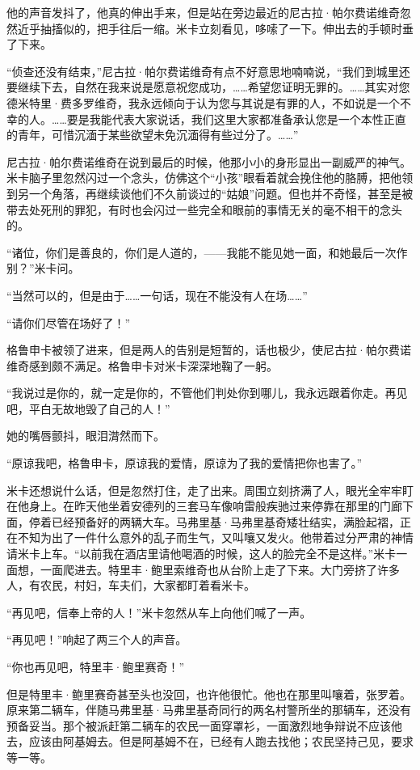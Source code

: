 \par 他的声音发抖了，他真的伸出手来，但是站在旁边最近的尼古拉·帕尔费诺维奇忽然近乎抽搐似的，把手往后一缩。米卡立刻看见，哆嗦了一下。伸出去的手顿时垂了下来。
\par “侦查还没有结束，”尼古拉·帕尔费诺维奇有点不好意思地喃喃说，“我们到城里还要继续下去，自然在我来说是愿意祝您成功，……希望您证明无罪的。……其实对您德米特里·费多罗维奇，我永远倾向于认为您与其说是有罪的人，不如说是一个不幸的人。……要是我能代表大家说话，我们这里大家都准备承认您是一个本性正直的青年，可惜沉湎于某些欲望未免沉湎得有些过分了。……”
\par 尼古拉·帕尔费诺维奇在说到最后的时候，他那小小的身形显出一副威严的神气。米卡脑子里忽然闪过一个念头，仿佛这个“小孩”眼看着就会挽住他的胳膊，把他领到另一个角落，再继续谈他们不久前谈过的“姑娘”问题。但也并不奇怪，甚至是被带去处死刑的罪犯，有时也会闪过一些完全和眼前的事情无关的毫不相干的念头的。
\par “诸位，你们是善良的，你们是人道的，——我能不能见她一面，和她最后一次作别？”米卡问。
\par “当然可以的，但是由于……一句话，现在不能没有人在场……”
\par “请你们尽管在场好了！”
\par 格鲁申卡被领了进来，但是两人的告别是短暂的，话也极少，使尼古拉·帕尔费诺维奇感到颇不满足。格鲁申卡对米卡深深地鞠了一躬。
\par “我说过是你的，就一定是你的，不管他们判处你到哪儿，我永远跟着你走。再见吧，平白无故地毁了自己的人！”
\par 她的嘴唇颤抖，眼泪潸然而下。
\par “原谅我吧，格鲁申卡，原谅我的爱情，原谅为了我的爱情把你也害了。”
\par 米卡还想说什么话，但是忽然打住，走了出来。周围立刻挤满了人，眼光全牢牢盯在他身上。在昨天他坐着安德列的三套马车像响雷般疾驰过来停靠在那里的门廊下面，停着已经预备好的两辆大车。马弗里基·马弗里基奇矮壮结实，满脸起褶，正在不知为出了一件什么意外的乱子而生气，又叫嚷又发火。他带着过分严肃的神情请米卡上车。“以前我在酒店里请他喝酒的时候，这人的脸完全不是这样。”米卡一面想，一面爬进去。特里丰·鲍里索维奇也从台阶上走了下来。大门旁挤了许多人，有农民，村妇，车夫们，大家都盯着看米卡。
\par “再见吧，信奉上帝的人！”米卡忽然从车上向他们喊了一声。
\par “再见吧！”响起了两三个人的声音。
\par “你也再见吧，特里丰·鲍里赛奇！”
\par 但是特里丰·鲍里赛奇甚至头也没回，也许他很忙。他也在那里叫嚷着，张罗着。原来第二辆车，伴随马弗里基·马弗里基奇同行的两名村警所坐的那辆车，还没有预备妥当。那个被派赶第二辆车的农民一面穿罩衫，一面激烈地争辩说不应该他去，应该由阿基姆去。但是阿基姆不在，已经有人跑去找他；农民坚持己见，要求等一等。
